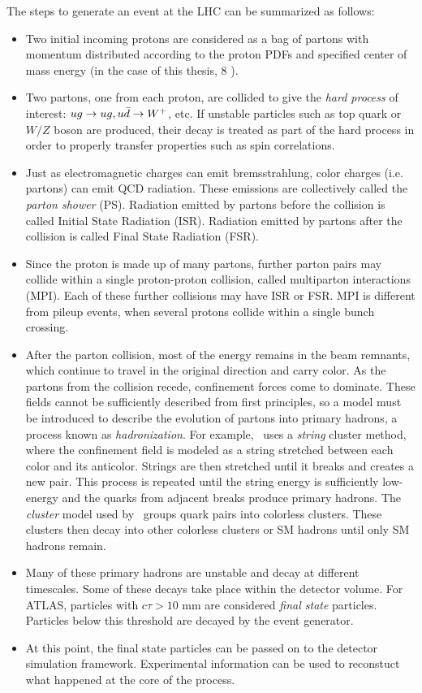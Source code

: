 The steps to generate an event at the LHC can be summarized as follows:
\begin{itemize}
\item Two initial incoming protons are considered as a bag of partons with momentum distributed according to the proton PDFs and specified center of mass energy (in the case of this thesis, 8 \tev).
\item Two partons, one from each proton, are collided to give the \emph{hard process} of interest: $ug \rightarrow ug, u\bar{d}\rightarrow W^{+}$, etc. If unstable particles such as top quark or $W/Z$ boson are produced, their decay is treated as part of the hard process in order to properly transfer properties such as spin correlations.
\item Just as electromagnetic charges can emit bremsstrahlung, color charges (i.e. partons) can emit QCD radiation. These emissions are collectively called the \emph{parton shower} (PS). Radiation emitted by partons before the collision is called Initial State Radiation (ISR). Radiation emitted by partons after the collision is called Final State Radiation (FSR).  
\item Since the proton is made up of many partons, further parton pairs may collide within a single proton-proton collision, called multiparton interactions (MPI). Each of these further collisions may have ISR or FSR. MPI is different from pileup events, when several protons collide within a single bunch crossing. 
\item After the parton collision, most of the energy remains in the beam remnants, which continue to travel in the original direction and carry color. As the partons from the collision recede, confinement forces come to dominate. These fields cannot be sufficiently described from first principles, so a model must be introduced to describe the evolution of partons into primary hadrons, a process known as \emph{hadronization}. For example, \py\ uses a \emph{string} cluster method, where the confinement field is modeled as a string stretched between each color and its anticolor. Strings are then stretched until it breaks and creates a new pair. This process is repeated until the string energy is sufficiently low-energy and the quarks from adjacent breaks produce primary hadrons. The \emph{cluster} model used by \hw\ groups quark pairs into colorless clusters. These clusters then decay into other colorless clusters or SM hadrons until only SM hadrons remain.
\item Many of these primary hadrons are unstable and decay at different timescales. Some of these decays take place within the detector volume. For ATLAS, particles with $c\tau > 10$ mm are considered \emph{final state} particles. Particles below this threshold are decayed by the event generator. 
\item At this point, the final state particles can be passed on to the detector simulation framework. Experimental information can be used to reconstuct what happened at the core of the process.
\end{itemize}

